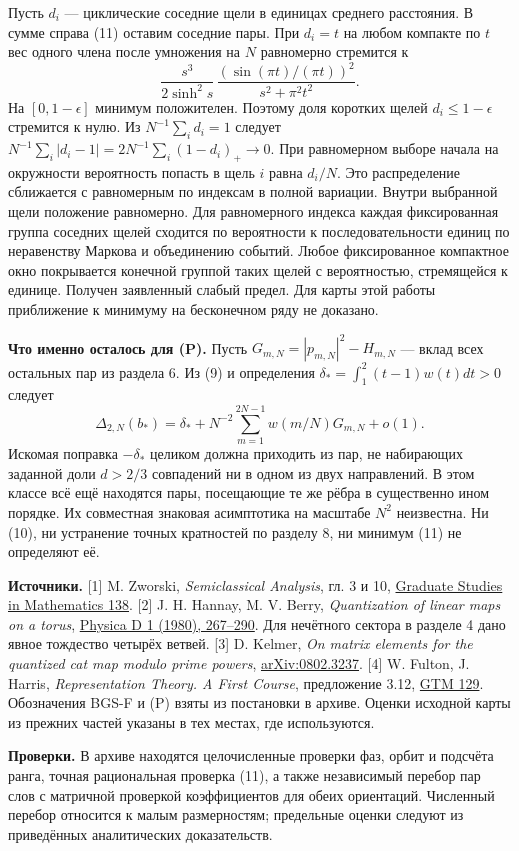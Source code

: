 \documentclass[11pt,a4paper]{article}
\begin{document}
Пусть $d_i$ --- циклические соседние щели в единицах среднего расстояния. В сумме справа (11) оставим соседние пары. При $d_i=t$ на любом компакте по $t$ вес одного члена после умножения на $N$ равномерно стремится к
\[
       \frac{s^3}{2\sinh^2s}\,
       \frac{(\sin(\pi t)/(\pi t))^2}{s^2+\pi^2t^2}.
\]
На $[0,1-\epsilon]$ минимум положителен. Поэтому доля коротких щелей $d_i\le1-\epsilon$ стремится к нулю. Из $N^{-1}\sum_i d_i=1$ следует $N^{-1}\sum_i|d_i-1|=2N^{-1}\sum_i(1-d_i)_+\to0$. При равномерном выборе начала на окружности вероятность попасть в щель $i$ равна $d_i/N$. Это распределение сближается с равномерным по индексам в полной вариации. Внутри выбранной щели положение равномерно. Для равномерного индекса каждая фиксированная группа соседних щелей сходится по вероятности к последовательности единиц по неравенству Маркова и объединению событий. Любое фиксированное компактное окно покрывается конечной группой таких щелей с вероятностью, стремящейся к единице. Получен заявленный слабый предел. Для карты этой работы приближение к минимуму на бесконечном ряду не доказано.

\textbf{Что именно осталось для (P).} Пусть $G_{m,N}=|p_{m,N}|^2-H_{m,N}$ --- вклад всех остальных пар из раздела 6. Из (9) и определения $\delta_*=\int_1^2(t-1)w(t)dt>0$ следует
\[
 \Delta_{2,N}(b_*)=\delta_*+
              N^{-2}\sum_{m=1}^{2N-1}w(m/N)G_{m,N}+o(1).
\]
Искомая поправка $-\delta_*$ целиком должна приходить из пар, не набирающих заданной доли $d>2/3$ совпадений ни в одном из двух направлений. В этом классе всё ещё находятся пары, посещающие те же рёбра в существенно ином порядке. Их совместная знаковая асимптотика на масштабе $N^2$ неизвестна. Ни (10), ни устранение точных кратностей по разделу 8, ни минимум (11) не определяют её.

\textbf{Источники.} [1] M. Zworski, \emph{Semiclassical Analysis}, гл. 3 и 10, \href{https://doi.org/10.1090/gsm/138}{Graduate Studies in Mathematics 138}. [2] J. H. Hannay, M. V. Berry, \emph{Quantization of linear maps on a torus}, \href{https://doi.org/10.1016/0167-2789(80)90026-3}{Physica D 1 (1980), 267--290}. Для нечётного сектора в разделе 4 дано явное тождество четырёх ветвей. [3] D. Kelmer, \emph{On matrix elements for the quantized cat map modulo prime powers}, \href{https://arxiv.org/abs/0802.3237}{arXiv:0802.3237}. [4] W. Fulton, J. Harris, \emph{Representation Theory. A First Course}, предложение 3.12, \href{https://doi.org/10.1007/978-1-4612-0979-9}{GTM 129}. Обозначения BGS-F и (P) взяты из постановки в архиве. Оценки исходной карты из прежних частей указаны в тех местах, где используются.

\textbf{Проверки.} В архиве находятся целочисленные проверки фаз, орбит и подсчёта ранга, точная рациональная проверка (11), а также независимый перебор пар слов с матричной проверкой коэффициентов для обеих ориентаций. Численный перебор относится к малым размерностям; предельные оценки следуют из приведённых аналитических доказательств.
\end{document}
